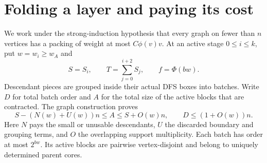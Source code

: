 \section{Folding a layer and paying its cost}\label{sec:fold}
We work under the strong-induction hypothesis that every graph on fewer
than $n$ vertices has a packing of weight at most $C\phi(v)v$.
At an active stage $0\le i\le k$, put $w=w_i\ge w_A$ and
\[
 S=S_i,\qquad T=\sum_{j=0}^{i+2}S_j,\qquad f=\Phi(bw).
\]
Descendant pieces are grouped inside their actual DFS boxes into batches.
Write $D$ for total batch order and $A$ for the total size of the active
blocks that are contracted. The graph construction proves
\begin{equation}\label{eq:fold-masses}
 S-(N(w)+U(w))n\le A\le S+O(w)n,
       \qquad D\le(1+O(w))n.
\end{equation}
Here $N$ pays the small or unusable descendants, $U$ the discarded boundary
and grouping terms, and $O$ the overlapping support multiplicity.
Each batch has order at most $2^{bw}$. Its active blocks are pairwise
vertex-disjoint and belong to uniquely determined parent cores.

